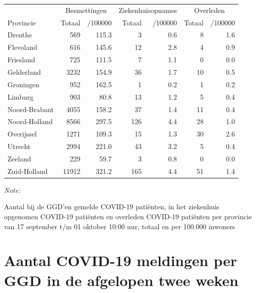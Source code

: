 \documentclass[
  english,
  man,floatsintext]{apa6}
\begin{document}
\begin{table}[H]
\centering
\begin{threeparttable}
\begin{tabular}{lrrrrrr}
\toprule
\multicolumn{1}{c}{ } & \multicolumn{2}{c}{Besmettingen} & \multicolumn{2}{c}{Ziekenhuisopnames} & \multicolumn{2}{c}{Overleden} \\
\cmidrule(l{3pt}r{3pt}){2-3} \cmidrule(l{3pt}r{3pt}){4-5} \cmidrule(l{3pt}r{3pt}){6-7}
Provincie & Totaal & /100000 & Totaal & /100000 & Totaal & /100000\\
\midrule
Drenthe & 569 & 115.3 & 3 & 0.6 & 8 & 1.6\\
Flevoland & 616 & 145.6 & 12 & 2.8 & 4 & 0.9\\
Friesland & 725 & 111.5 & 7 & 1.1 & 0 & 0.0\\
Gelderland & 3232 & 154.9 & 36 & 1.7 & 10 & 0.5\\
Groningen & 952 & 162.5 & 1 & 0.2 & 1 & 0.2\\
Limburg & 903 & 80.8 & 13 & 1.2 & 5 & 0.4\\
Noord-Brabant & 4055 & 158.2 & 37 & 1.4 & 11 & 0.4\\
Noord-Holland & 8566 & 297.5 & 126 & 4.4 & 28 & 1.0\\
Overijssel & 1271 & 109.3 & 15 & 1.3 & 30 & 2.6\\
Utrecht & 2994 & 221.0 & 43 & 3.2 & 5 & 0.4\\
Zeeland & 229 & 59.7 & 3 & 0.8 & 0 & 0.0\\
Zuid-Holland & 11912 & 321.2 & 165 & 4.4 & 51 & 1.4\\
\bottomrule
\end{tabular}
\begin{tablenotes}
\item \textit{Note: } 
\item Aantal bij de GGD’en gemelde COVID-19 patiënten, in het ziekenhuis opgenomen COVID-19 patiënten en overleden COVID-19 patiënten per provincie van 17 september t/m 01 oktober 10:00 uur, totaal en per 100.000 inwoners
\end{tablenotes}
\end{threeparttable}
\end{table}

\newpage

\hypertarget{aantal-covid-19-meldingen-per-ggd-in-de-afgelopen-twee-weken}{%
\section{Aantal COVID-19 meldingen per GGD in de afgelopen twee weken}\label{aantal-covid-19-meldingen-per-ggd-in-de-afgelopen-twee-weken}}
\end{document}
